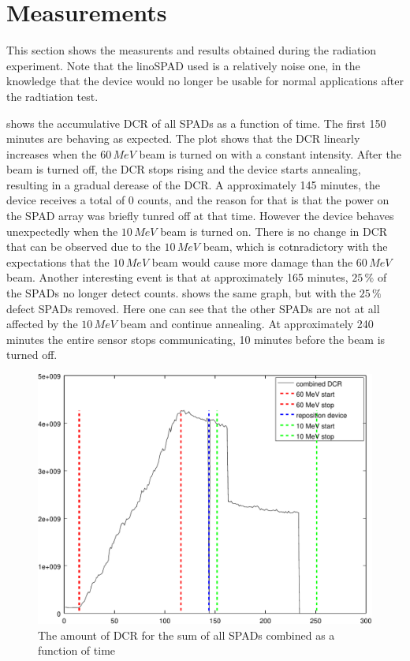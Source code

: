 \section{Measurements}\label{ssec:results}
This section shows the measurents and results obtained during the radiation experiment. Note that the linoSPAD used is a relatively noise one, in the knowledge that the device  would no longer be usable for normal applications after the radtiation test.

 shows the accumulative DCR of all SPADs as a function of time. The first 150 minutes are behaving as expected. The plot shows that the DCR linearly increases when the $60\,MeV$ beam  is turned on with a constant intensity. After the beam is turned off, the DCR stops rising and the device starts annealing, resulting in a gradual derease of the DCR. A approximately 145 minutes, the device receives a total of 0 counts, and the reason for that is that the power on the SPAD array was briefly tunred off at that time. However the device behaves unexpectedly when the $10\,MeV$ beam is turned on. There is no change in DCR that can be observed due to the $10\,MeV$ beam, which is cotnradictory with the expectations that the $10\,MeV$ beam would cause more damage than the $60\,MeV$ beam. Another interesting event is that at approximately 165 minutes, $25\,\%$ of the SPADs no longer detect counts.  shows the same graph, but with the $25\,\%$ defect SPADs removed. Here one can see that the other SPADs are not at all affected by the $10\,MeV$ beam and continue annealing. At approximately 240 minutes the entire sensor stops communicating, 10 minutes before the beam is turned off.



\begin{figure}[h]
\centering
	\includegraphics[width=0.6\linewidth]{fig/count_vs_time_sum_all.pdf}
\caption{The amount of DCR for the sum of all SPADs combined as a function of time}
\label{fig:count_vs_time_sum_all}
\end{figure}


